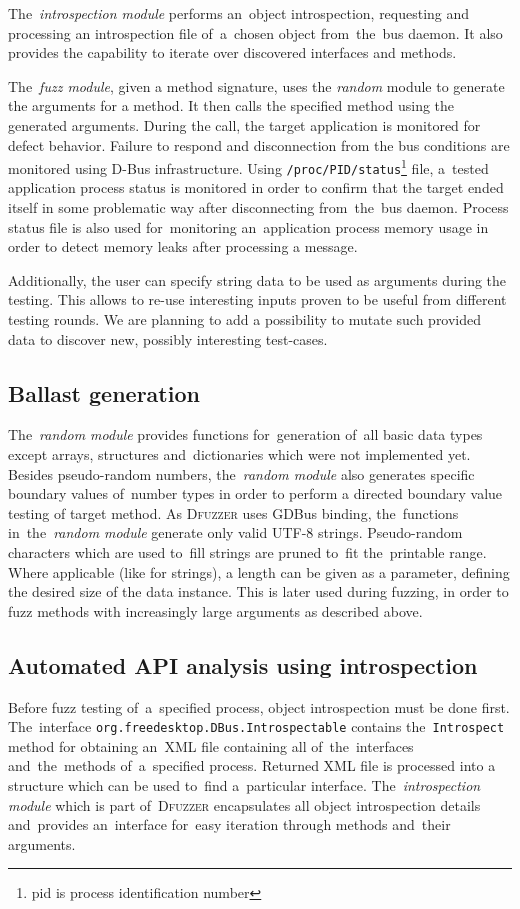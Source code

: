 \documentclass[conference]{IEEEtran}
\begin{document}
The~\emph{introspection module} performs an~object
introspection, requesting and processing an introspection file of~a~chosen
object from~the~bus daemon. It also provides the capability to iterate over
discovered interfaces and methods.


The~\emph{fuzz module}, given a method signature, uses the \emph{random} module
to generate the arguments for a method. It then calls the specified method
using the generated arguments. During the call, the target application is
monitored for defect behavior. Failure to respond and disconnection from the
bus conditions are monitored using D-Bus infrastructure. Using
\texttt{/proc/PID/status}\footnote{pid is process identification number} file,
a~tested application process status is monitored in order to confirm that the
target ended itself in some problematic way after disconnecting from~the~bus
daemon. Process status file is also used for~monitoring an~application process
memory usage in order to detect memory leaks after processing a message.


Additionally, the user can specify string data to be used as arguments
during the testing. This allows to re-use interesting inputs proven to be useful
from different testing rounds. We are planning to add a possibility to mutate
such provided data to discover new, possibly interesting test-cases.

\subsection{Ballast generation} The~\emph{random module} provides functions
for~generation of~all basic data types except arrays, structures
and~dictionaries which were not implemented yet. Besides pseudo-random numbers,
the~\emph{random module} also generates specific boundary values of~number
types in order to perform a directed boundary value testing of target method.
As \textsc{Dfuzzer} uses GDBus binding, the~functions in~the~\emph{random
module} generate only valid UTF-8 strings. Pseudo-random characters which are
used to~fill strings are pruned to~fit the~printable range. Where applicable
(like for strings), a length can be given as a parameter, defining the desired
size of the data instance. This is later used during fuzzing, in order to fuzz
methods with increasingly large arguments as described above.

\subsection{Automated API analysis using introspection}
Before fuzz testing of~a~specified process, object introspection must be done
first. The~interface \texttt{org.freedesktop.DBus.Introspectable} contains
the~\texttt{Introspect} method for obtaining an~XML file containing all
of~the~interfaces and~the~methods of~a~specified process. Returned XML file is
processed into a structure which can be used to~find a~particular interface.
The~\emph{introspection module} which is part of~\textsc{Dfuzzer} encapsulates all
object introspection details and~provides an~interface for~easy iteration
through methods and~their arguments.
\end{document}
